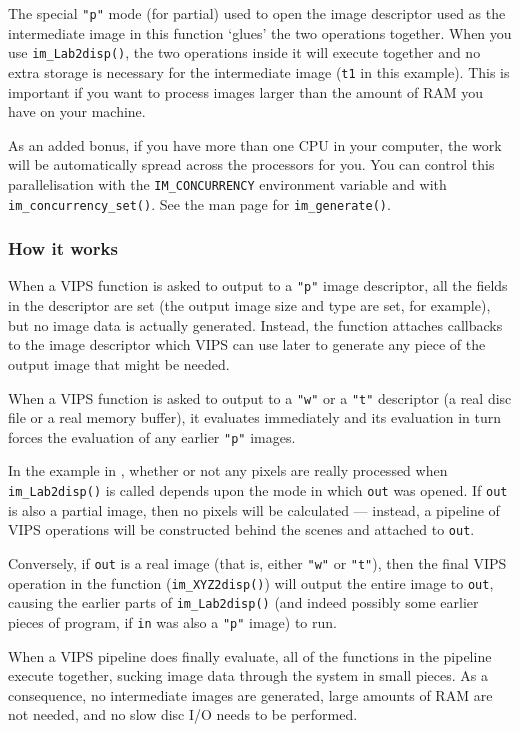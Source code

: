 The special \verb+"p"+ mode (for partial) used to open the image descriptor
used as the intermediate image in this function `glues' the two operations
together. When you use \verb+im_Lab2disp()+, the two operations inside it
will execute together and no extra storage is necessary for the intermediate
image (\verb+t1+ in this example).  This is important if you want to process
images larger than the amount of RAM you have on your machine.

As an added bonus, if you have more than one CPU in your computer, the work
will be automatically spread across the processors for you. You can control
this parallelisation with the \verb+IM_CONCURRENCY+ environment variable and
with \verb+im_concurrency_set()+. See the man page for \verb+im_generate()+.

\subsubsection{How it works}

When a VIPS function is asked to output to a \verb+"p"+ image descriptor,
all the fields in the descriptor are set (the output image size and type
are set, for example), but no image data is actually generated. Instead,
the function attaches callbacks to the image descriptor which VIPS can use
later to generate any piece of the output image that might be needed.

When a VIPS function is asked to output to a \verb+"w"+ or a \verb+"t"+
descriptor (a real disc file or a real memory buffer), it evaluates
immediately and its evaluation in turn forces the evaluation of any earlier
\verb+"p"+ images.

In the example in , whether or not any pixels are really
processed when \verb+im_Lab2disp()+ is called depends upon the mode in
which \verb+out+ was opened. If \verb+out+ is also a partial image, then
no pixels will be calculated --- instead, a pipeline of VIPS operations
will be constructed behind the scenes and attached to \verb+out+.

Conversely, if \verb+out+ is a real image (that is, either \verb+"w"+
or \verb+"t"+), then the final VIPS operation in the function
(\verb+im_XYZ2disp()+) will output the entire image to \verb+out+, causing
the earlier parts of \verb+im_Lab2disp()+ (and indeed possibly some earlier
pieces of program, if \verb+in+ was also a \verb+"p"+ image) to run.

When a VIPS pipeline does finally evaluate, all of the functions in the
pipeline execute together, sucking image data through the system in small
pieces. As a consequence, no intermediate images are generated, large
amounts of RAM are not needed, and no slow disc I/O needs to be performed.

